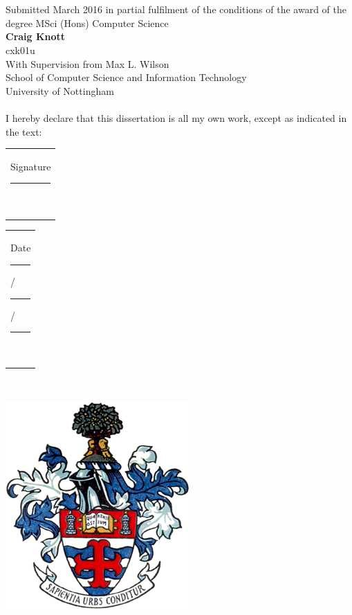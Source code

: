 \begin{center}
\ \\[1cm]
\LARGE{\textbf{\paperTitleStart}}\ \\[0.5cm]
\large{Submitted March 2016 in partial fulfilment of the conditions of the award of the degree MSci (Hons) Computer Science}
\ \\[1cm]
\large{\textbf{Craig Knott}} \ \\
\large{cxk01u}\ \\[0.3cm]

With Supervision from Max L. Wilson\\[0.3cm]

School of Computer Science and Information Technology \ \\
University of Nottingham \ \\
 \ \\[0.5cm]
I hereby declare that this dissertation is all my own work, except as indicated in the text: \ \\[1cm]
\end{center}

\begin{Large}
\begin{center}
\begin{tabular}{l}
Signature \rule{5cm}{1pt} \ \\[0.2cm]
\end{tabular}
\end{center}

\begin{center}
\begin{tabular}{l}
Date \rule{1.5cm}{1pt}/\rule{1.5cm}{1pt}/\rule{1.5cm}{1pt}\ \\
\end{tabular}
\end{center}
\end{Large}

\ \\[0.6cm]
\begin{center}
\includegraphics[scale=0.55]{images/UoN_Arms}
\end{center}